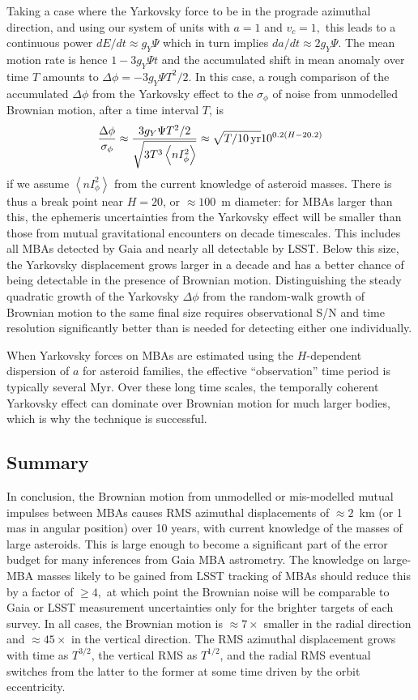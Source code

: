\documentclass[linenumbers, onecolumn]{aastex631}
\newcommand{\nIphi}{\left\langle nI_\phi^2\right\rangle}
\begin{document}
Taking a case where the Yarkovsky force to be in the prograde azimuthal direction, and using our system of units with $a=1$ and $v_c=1,$ this leads to a continuous power $dE/dt\approx g_Y\Psi$ which in turn implies $da/dt\approx2g_Y\Psi.$   The mean motion rate is hence $1-3 g_Y\Psi t$ and the accumulated shift in mean anomaly over time $T$ amounts to $\Delta\phi = -3 g_Y \Psi  T^2/2.$   In this case, a rough comparison of the accumulated $\Delta\phi$ from the Yarkovsky effect to the $\sigma_\phi$ of noise from unmodelled Brownian motion, after a time interval $T$, is
\begin{equation}
   \frac{\Delta\phi}{\sigma_\phi} \approx \frac{ 3 g_Y \Psi T^2/2}{\sqrt{3 T^3 \nIphi}} \approx \sqrt{T/10\,{\rm yr}} 10^{0.2(H-20.2)}
     \label{eq:yarkovsky}
\end{equation}
if we assume $\nIphi$ from the current knowledge of asteroid masses.   There is thus a break point near $H=20$, or $\approx100$~m diameter: for MBAs larger than this, the ephemeris uncertainties from the Yarkovsky effect will be smaller than those from mutual gravitational encounters on decade timescales. This includes all MBAs detected by Gaia and nearly all detectable by LSST.  Below this size, the Yarkovsky displacement grows larger in a decade and has a better chance of being detectable in the presence of Brownian motion.  Distinguishing the steady quadratic growth of the Yarkovsky $\Delta\phi$ from the random-walk growth of Brownian motion to the same final size requires observational S/N and time resolution significantly better than is needed for detecting either one individually.

When Yarkovsky forces on MBAs are estimated using the $H$-dependent dispersion of $a$ for asteroid families, the effective ``observation'' time period is typically several Myr.  Over these long time scales, the temporally coherent Yarkovsky effect can dominate over Brownian motion for much larger bodies, which is why the technique is successful.

\subsection{Summary}

In conclusion, the Brownian motion from unmodelled or mis-modelled mutual impulses between MBAs causes RMS azimuthal displacements of $\approx2$~km (or 1 mas in angular position) over 10 years, with current knowledge of the masses of large asteroids.  This is large enough to become a significant part of the error budget for many inferences from Gaia MBA astrometry.  The knowledge on large-MBA masses likely to be gained from LSST tracking of MBAs should reduce this by a factor of $\ge4,$ at which point the Brownian noise will be comparable to Gaia or LSST measurement uncertainties only for the brighter targets of each survey.  In all cases, the Brownian motion is $\approx7\times$ smaller in the radial direction and $\approx45\times$ in the vertical direction.  The RMS azimuthal displacement grows with time as $T^{3/2}$, the vertical RMS as $T^{1/2}$, and the radial RMS eventual switches from the latter to the former at some time driven by the orbit eccentricity.
\end{document}
